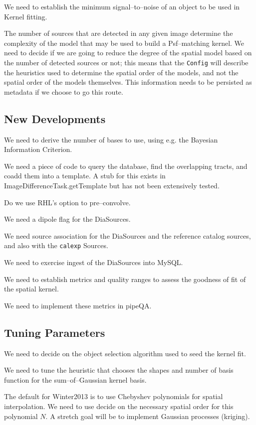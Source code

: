 \documentclass[12pt]{article}
\begin{document}
We need to establish the minimum signal--to--noise of an object to be
used in Kernel fitting.

The number of sources that are detected in any given image determine
the complexity of the model that may be used to build a Psf--matching
kernel.  We need to decide if we are going to reduce the degree of the
spatial model based on the number of detected sources or not; this
means that the {\tt Config} will describe the heuristics used to
determine the spatial order of the models, and not the spatial order
of the models themselves.  This information needs to be persisted as
metadata if we choose to go this route.

\subsection{New Developments}
We need to derive the number of bases to use, using e.g. the Bayesian
Information Criterion.

We need a piece of code to query the database, find the overlapping
tracts, and coadd them into a template.  A stub for this exists in
ImageDifferenceTask.getTemplate but has not been extensively tested.

Do we use RHL's option to pre--convolve.

We need a dipole flag for the DiaSources.

We need source association for the DiaSources and the reference
catalog sources, and also with the {\tt calexp} Sources.

We need to exercise ingest of the DiaSources into MySQL.

We need to establish metrics and quality ranges to assess the goodness
of fit of the spatial kernel.

We need to implement these metrics in pipeQA.

\subsection{Tuning Parameters}
We need to decide on the object selection algorithm used to seed the
kernel fit.

We need to tune the heuristic that chooses the shapes and number of
basis function for the sum--of--Gaussian kernel basis.

The default for Winter2013 is to use Chebyshev polynomials for spatial
interpolation.  We need to use decide on the necessary spatial order
for this polynomial $N$.  A stretch goal will be to implement Gaussian
processes (kriging).
\end{document}
